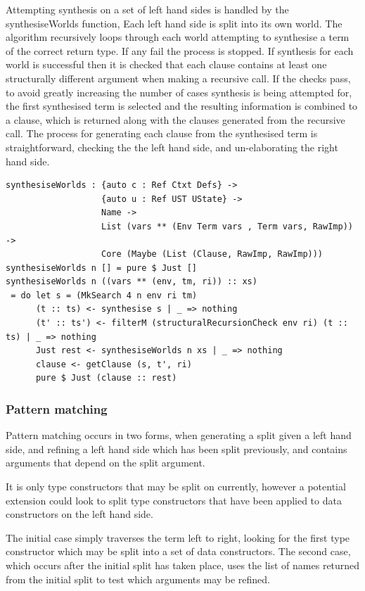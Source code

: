 \documentclass[a4paper]{article}
\begin{document}
Attempting synthesis on a set of left hand sides is handled by the synthesiseWorlds function,
Each left hand side is split into its own world.
The algorithm recursively loops through each world attempting to synthesise a term of
the correct return type. If any fail the process is stopped. 
If synthesis for each world is successful then it is checked that 
each clause contains at least one structurally different argument when making a recursive call.
If the checks pass, to avoid greatly increasing the number of cases synthesis is being attempted for,
the first synthesised term is selected and the resulting information is combined to a
clause, which is returned along with the clauses generated from the recursive call.
The process for generating each clause from the synthesised term is straightforward, checking the
the left hand side, and un-elaborating the right hand side.

\begin{center}
  \begin{verbatim}
synthesiseWorlds : {auto c : Ref Ctxt Defs} -> 
                   {auto u : Ref UST UState} -> 
                   Name ->
                   List (vars ** (Env Term vars , Term vars, RawImp)) ->
                   Core (Maybe (List (Clause, RawImp, RawImp)))
synthesiseWorlds n [] = pure $ Just []
synthesiseWorlds n ((vars ** (env, tm, ri)) :: xs)
 = do let s = (MkSearch 4 n env ri tm)
      (t :: ts) <- synthesise s | _ => nothing  
      (t' :: ts') <- filterM (structuralRecursionCheck env ri) (t :: ts) | _ => nothing
      Just rest <- synthesiseWorlds n xs | _ => nothing
      clause <- getClause (s, t', ri)
      pure $ Just (clause :: rest)
  \end{verbatim}
\end{center}

\clearpage
\subsubsection{Pattern matching}

Pattern matching occurs in two forms, when generating a split given a
left hand side, and refining a left hand side which has been split previously,
and contains arguments that depend on the split argument.

It is only type constructors that may be split on currently,
however a potential extension could look to split type constructors
that have been applied to data constructors on the left hand side.

The initial case simply traverses the term left to right,
looking for the first type constructor which may be split into
a set of data constructors. The second case, which occurs after the
initial split has taken place, uses the list of names returned from the
initial split to test which arguments may be refined.
\end{document}
